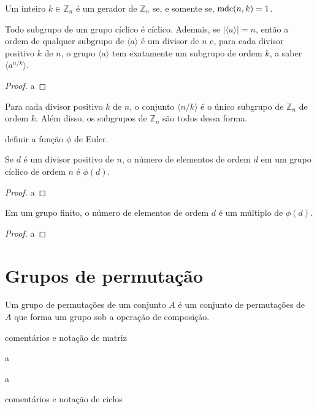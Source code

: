 %
\begin{corollary}
\label{cor-geradores-Zn}
    Um inteiro $k\in \mathbb{Z}_n$ é um gerador de $\mathbb{Z}_n$ se, e somente se, $\operatorname{mdc}(n,k) = 1$.
\end{corollary}
%
\begin{theorem}
\label{teo-fund-grupos-ciclicos}
    Todo subgrupo de um grupo cíclico é cíclico. Ademais, se $|\langle a \rangle| = n$, então
    a ordem de qualquer subgrupo de $\langle a \rangle$ é um divisor de $n$ e, para cada divisor
    positivo $k$ de $n$, o grupo $\langle a \rangle$ tem exatamente um subgrupo de ordem $k$, a saber
    $\langle a^{n/k} \rangle$.
\end{theorem}
%
\begin{proof}
    a
\end{proof}
%
\begin{corollary}
\label{cor-subgrupos-Zn}
    Para cada divisor positivo $k$ de $n$, o conjunto $\langle n/k \rangle$ é o único subgrupo
    de $\mathbb{Z}_n$ de ordem $k$. Além disso, os subgrupos de $\mathbb{Z}_n$ são todos dessa
    forma.
\end{corollary}
%
definir a função $\phi$ de Euler.
%
\begin{theorem}
\label{teo-num-elementos-por-ordem}
    Se $d$ é um divisor positivo de $n$, o número de elementos de ordem $d$ em um grupo
    cíclico de ordem $n$ é $\phi(d)$.
\end{theorem}
%
\begin{proof}
    a
\end{proof}
%
\begin{corollary}
\label{cor-num-elementos-por-ordem}
    Em um grupo finito, o número de elementos de ordem $d$ é um múltiplo de $\phi(d)$.
\end{corollary}
%
\begin{proof}
    a
\end{proof}
%

\section{Grupos de permutação}
    \begin{definition}
    \label{def-grupo-perm}
        Um grupo de permutações de um conjunto $A$ é um conjunto de permutações de $A$ que forma
        um grupo sob a operação de composição.
    \end{definition}
    comentários e notação de matriz
    \begin{example}
        a
    \end{example}
    \begin{example}
        a
    \end{example}
    comentários e notação de ciclos
